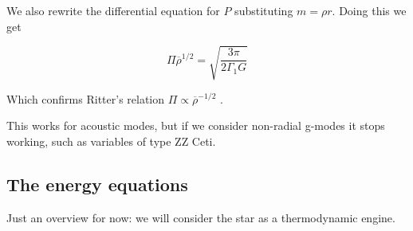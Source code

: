 \documentclass[main.tex]{subfiles}
\begin{document}
We also rewrite the differential equation for \(P\) substituting \(m=\rho r\). Doing this we get

\begin{equation}
  \Pi  \overline{\rho}^{1/2}= \sqrt{\frac{3 \pi}{2 \Gamma_1 G}}
\end{equation}

Which confirms Ritter's relation \(\Pi \propto \overline{\rho}^{-1/2} \) .

This works for acoustic modes, but if we consider non-radial g-modes it stops working, such as variables of type ZZ Ceti.

\subsection{The energy equations}

Just an overview for now: we will consider the star as a thermodynamic engine.
\end{document}

